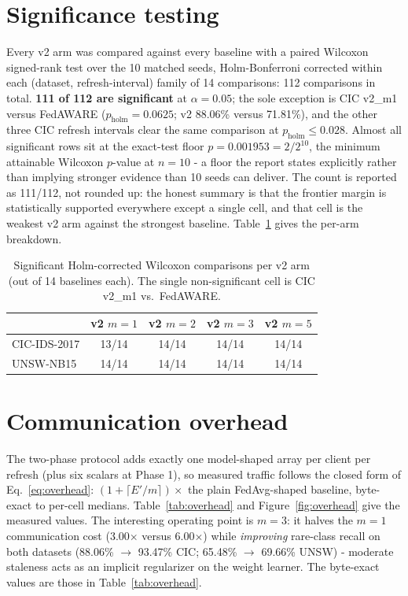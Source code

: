 \documentclass[11pt,a4paper]{report}
\begin{document}
\section{Significance testing}
\label{sec:significance}

Every v2 arm was compared against every baseline with a paired Wilcoxon
signed-rank test over the 10 matched seeds, Holm-Bonferroni corrected within
each (dataset, refresh-interval) family of 14 comparisons: 112 comparisons
in total. \textbf{111 of 112 are significant} at $\alpha = 0.05$; the sole
exception is CIC v2\_m1 versus FedAWARE ($p_{\mathrm{holm}} = 0.0625$; v2
88.06\% versus 71.81\%), and the other three CIC refresh intervals clear
the same comparison at $p_{\mathrm{holm}} \leq 0.028$. Almost all
significant rows sit at the exact-test floor $p = 0.001953 = 2/2^{10}$,
the minimum attainable Wilcoxon $p$-value at $n = 10$ - a floor the report
states explicitly rather than implying stronger evidence than 10 seeds can
deliver. The count is reported as 111/112, not rounded up: the honest
summary is that the frontier margin is statistically supported everywhere
except a single cell, and that cell is the weakest v2 arm against the
strongest baseline. Table~\ref{tab:sig-perarm} gives the per-arm breakdown.

\begin{table}[htbp]
  \centering\footnotesize
  \caption{Significant Holm-corrected Wilcoxon comparisons per v2 arm
  (out of 14 baselines each). The single non-significant cell is CIC
  v2\_m1 vs.\ FedAWARE.}
  \label{tab:sig-perarm}
  \begin{tabular}{@{}lcccc@{}}
    \toprule
     & v2 $m{=}1$ & v2 $m{=}2$ & v2 $m{=}3$ & v2 $m{=}5$\\
    \midrule
    CIC-IDS-2017 & 13/14 & 14/14 & 14/14 & 14/14\\
    UNSW-NB15    & 14/14 & 14/14 & 14/14 & 14/14\\
    \bottomrule
  \end{tabular}
\end{table}

\section{Communication overhead}
\label{sec:overhead}

The two-phase protocol adds exactly one model-shaped array per client per
refresh (plus six scalars at Phase 1), so measured traffic follows the
closed form of Eq.~\eqref{eq:overhead}: $(1 + \lceil E'/m \rceil)\times$ the
plain FedAvg-shaped baseline, byte-exact to per-cell medians.
Table~\ref{tab:overhead} and Figure~\ref{fig:overhead} give the measured
values. The interesting operating point is $m = 3$: it halves the $m = 1$
communication cost (3.00$\times$ versus 6.00$\times$) while \emph{improving}
rare-class recall on both datasets (88.06\% $\to$ 93.47\% CIC; 65.48\%
$\to$ 69.66\% UNSW) - moderate staleness acts as an implicit regularizer on
the weight learner. The byte-exact values are those in
Table~\ref{tab:overhead}.
\end{document}

